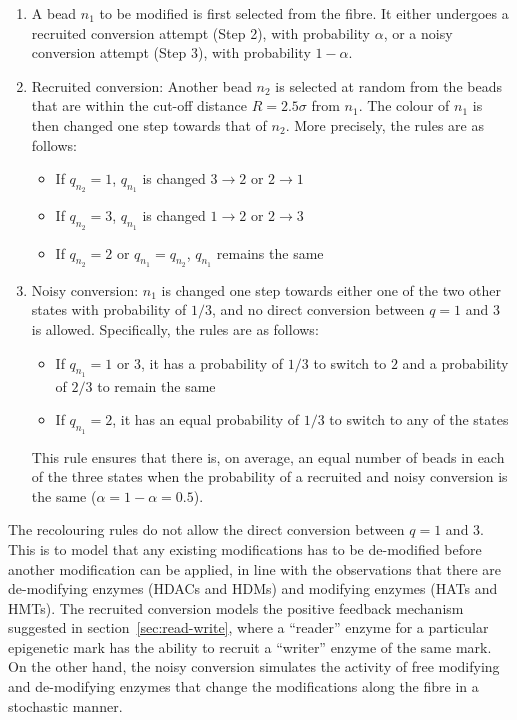 \documentclass[12pt]{article}
\begin{document}
\begin{enumerate}
\item A bead $n_1$ to be modified is first selected from the fibre. It either undergoes a recruited conversion attempt (Step 2), with probability $\alpha$, or a noisy conversion attempt (Step 3), with probability $1 - \alpha$.

\item Recruited conversion: Another bead  $n_2$ is selected at random from the beads that are within the cut-off distance $R = 2.5\sigma$ from $n_1$. The colour of $n_1$ is then changed one step towards that of $n_2$. More precisely, the rules are as follows:
\begin{itemize}
\item If $q_{n_2} = 1$, $q_{n_1}$ is changed $3 \rightarrow 2$ or $2 \rightarrow 1$
\item If $q_{n_2} = 3$, $q_{n_1}$ is changed $1 \rightarrow 2$ or $2 \rightarrow 3$
\item If $q_{n_2} = 2$ or $q_{n_1} = q_{n_2}$, $q_{n_1}$ remains the same
\end{itemize}

\item Noisy conversion:  $n_1$ is changed one step towards either one of the two other states with probability of $1/3$, and no direct conversion between $q  = 1$ and 3 is allowed. Specifically, the rules are as follows:
\begin{itemize}
\item If $q_{n_1} = 1$ or $3$, it has a probability of $1/3$ to switch to $2$ and a probability of $2/3$ to remain the same
\item If $q_{n_1} = 2$, it has an equal probability of $1/3$ to switch to any of the states
\end{itemize}
This rule ensures that there is, on average, an equal number of beads in each of the three states when the probability of a recruited and noisy conversion is the same ($\alpha = 1 - \alpha = 0.5$).
\end{enumerate}
The recolouring rules do not allow the direct conversion between $q = 1$ and 3. This is to model that any existing modifications has to be de-modified before another modification can be applied, in line with the observations that there are de-modifying enzymes (HDACs and HDMs) and modifying enzymes (HATs and HMTs). The recruited conversion models the positive feedback mechanism suggested in section~\ref{sec:read-write}, where a ``reader'' enzyme for a particular epigenetic mark has the ability to recruit a ``writer'' enzyme of the same mark. On the other hand, the noisy conversion simulates the activity of free modifying and de-modifying enzymes that change the modifications along the fibre in a stochastic manner.
\end{document}
